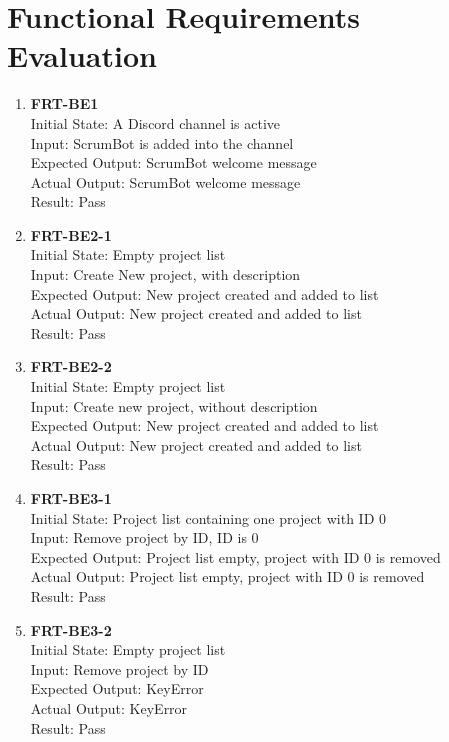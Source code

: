 \documentclass[12pt, titlepage]{article}
\begin{document}
\section{Functional Requirements Evaluation}
\begin{enumerate}
    \item{\textbf{FRT-BE1}}\\
    Initial State: A Discord channel is active\\
    Input: ScrumBot is added into the channel\\
    Expected Output: ScrumBot welcome message\\
    Actual Output: ScrumBot welcome message\\
    Result: Pass
    
    \item{\textbf{FRT-BE2-1}}\\
    Initial State: Empty project list\\
    Input: Create New project, with description\\
    Expected Output: New project created and added to list\\
    Actual Output: New project created and added to list\\
    Result: Pass

    \item{\textbf{FRT-BE2-2}}\\
    Initial State: Empty project list\\
    Input: Create new project, without description\\
    Expected Output: New project created and added to list\\
    Actual Output: New project created and added to list\\
    Result: Pass
    
    \item{\textbf{FRT-BE3-1}}\\
    Initial State: Project list containing one project with ID 0\\
    Input: Remove project by ID, ID is 0\\
    Expected Output: Project list empty, project with ID 0 is removed\\
    Actual Output: Project list empty, project with ID 0 is removed\\
    Result: Pass

    \item{\textbf{FRT-BE3-2}}\\
    Initial State: Empty project list\\
    Input: Remove project by ID\\
    Expected Output: KeyError\\
    Actual Output: KeyError\\
    Result: Pass
    

\end{enumerate}
\end{document}
